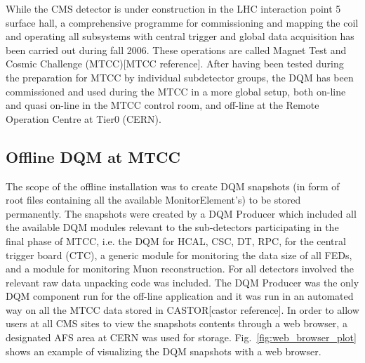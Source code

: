 \documentclass[a4paper]{cmspaper}
\begin{document}
While the CMS detector is under construction in the LHC interaction point 5 surface hall, a comprehensive 
programme for commissioning and mapping the coil and operating all subsystems with central trigger and global 
data acquisition has been carried out during fall 2006. These operations are called Magnet Test and Cosmic 
Challenge (MTCC)[MTCC reference]. After having been tested during the preparation for MTCC by individual 
subdetector groups, the DQM has been commissioned and used during the MTCC in a more global setup,
both on-line and quasi on-line in the MTCC control room, and off-line at the Remote Operation Centre at Tier0 (CERN). 


\subsection{Offline DQM at MTCC} \label{sec:dqmcommissioningoffline}
The scope of the offline installation was to create DQM snapshots (in form of root files containing all the available MonitorElement's)
to be stored permanently. The snapshots were created by a DQM Producer which included all the available DQM 
modules relevant to the sub-detectors participating in the final phase of MTCC, i.e. the DQM for HCAL, CSC, DT, RPC, 
for the central trigger board (CTC), a generic module for monitoring the data size of all 
FEDs, and a module for monitoring Muon reconstruction. For all detectors involved the relevant raw data
unpacking code was included. The DQM Producer was the only DQM component run for the off-line application and it was
run in an automated way on all the MTCC data stored in CASTOR[castor reference]. In order to allow users at all CMS sites to view the
snapshots contents through a web browser, a designated AFS area at CERN was used for storage. Fig.~\ref{fig:web_browser_plot} shows an example of
visualizing the DQM snapshots with a web browser.
%
\end{document}
